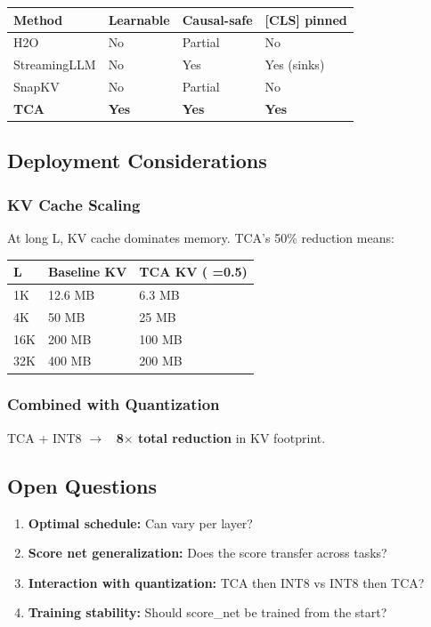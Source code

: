 \begin{table}[H]
\centering
\small
\begin{tabular}{llll}
\toprule
\textbf{Method} & \textbf{Learnable} & \textbf{Causal-safe} & \textbf{[CLS] pinned} \\
\midrule
H2O & No & Partial & No \\
StreamingLLM & No & Yes & Yes (sinks) \\
SnapKV & No & Partial & No \\
\textbf{TCA} & \textbf{Yes} & \textbf{Yes} & \textbf{Yes} \\
\bottomrule
\end{tabular}
\end{table}

\subsection{Deployment Considerations}

\subsubsection{KV Cache Scaling}

At long L, KV cache dominates memory. TCA's 50\% reduction means:

\begin{table}[H]
\centering
\small
\begin{tabular}{lll}
\toprule
\textbf{L} & \textbf{Baseline KV} & \textbf{TCA KV ( =0.5)} \\
\midrule
1K & 12.6 MB & 6.3 MB \\
4K & 50 MB & 25 MB \\
16K & 200 MB & 100 MB \\
32K & 400 MB & 200 MB \\
\bottomrule
\end{tabular}
\end{table}

\subsubsection{Combined with Quantization}

TCA + INT8 $\to$ \textbf{~8$\times$ total reduction} in KV footprint.

\subsection{Open Questions}

\begin{enumerate}
\item \textbf{Optimal   schedule:} Can   vary per layer?
\item \textbf{Score net generalization:} Does the score transfer across tasks?
\item \textbf{Interaction with quantization:} TCA then INT8 vs INT8 then TCA?
\item \textbf{Training stability:} Should score\_net be trained from the start?

\end{enumerate}
